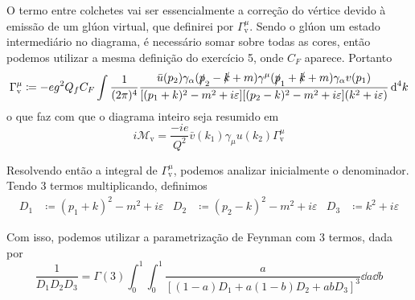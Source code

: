 O termo entre colchetes vai ser essencialmente a correção do vértice devido à emissão de um glúon virtual, que definirei por $\Gamma_{\text{v}}^{\mu}$. Sendo o glúon um estado intermediário no diagrama, é necessário somar sobre todas as cores, então podemos utilizar a mesma definição do exercício 5, onde $C_{F}$ aparece. Portanto
    \begin{equation*}
        \Gamma_{\text{v}}^{\mu} \coloneqq -eg^{2}Q_{f}C_{F} \int 
        \dfrac{1}{(2\pi)^{4}}
        \dfrac{\bar{u}(p_{2}) \gamma_{\alpha} (\slashed{p}_{2} - \slashed{k} + m) \gamma^{\mu} (\slashed{p}_{1} + \slashed{k} + m) \gamma_{\alpha} v(p_{1})}{\qty[(p_{1} + k)^{2} - m^{2} + i\varepsilon]\qty[(p_{2} - k)^{2} - m^{2} + i\varepsilon]\qty(k^{2}+i\varepsilon)} 
        \dd[4]{k}
    \end{equation*}
o que faz com que o diagrama inteiro seja resumido em
    \begin{equation*}
        i\mathcal{M}_{\text{v}} = \dfrac{-ie}{Q^{2}}\bar{v}(k_{1}) 
        \gamma_{\mu} 
        u(k_{2})
        \Gamma_{\text{v}}^{\mu}
    \end{equation*}

Resolvendo então a integral de $\Gamma_{\text{v}}^{\mu}$, podemos analizar inicialmente o denominador. Tendo 3 termos multiplicando, definimos
    \begin{align*}
        D_{1} &\coloneqq (p_{1}+k)^{2} - m^{2} + i\varepsilon & 
        D_{2} &\coloneqq (p_{2}-k)^{2} - m^{2} + i\varepsilon & 
        D_{3} &\coloneqq k^{2} + i\varepsilon
    \end{align*}

Com isso, podemos utilizar a parametrização de Feynman com 3 termos, dada por
    \begin{equation*}
        \dfrac{1}{D_{1}D_{2}D_{3}} = \Gamma(3)\int_{0}^{1}\int_{0}^{1} \dfrac{a}{[(1-a)D_{1} + a(1-b)D_{2} + abD_{3}]^{3}}\dd{a}\dd{b}
    \end{equation*}

